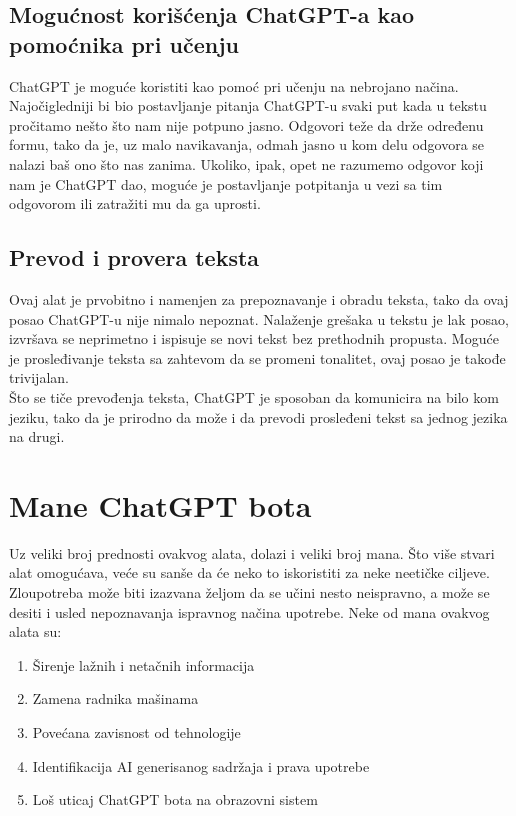 \documentclass[fleqn, 12pt]{article}
\begin{document}
    \subsection{Mogućnost korišćenja ChatGPT-a kao pomoćnika pri učenju}
        \begin{text}
            ChatGPT je moguće koristiti kao pomoć pri učenju na nebrojano načina. Najočigledniji bi bio postavljanje pitanja ChatGPT-u svaki put kada u tekstu pročitamo nešto što nam nije potpuno jasno. Odgovori teže da drže određenu formu, tako da je, uz malo navikavanja, odmah jasno u kom delu odgovora se nalazi baš ono što nas zanima. Ukoliko, ipak, opet ne razumemo odgovor koji nam je ChatGPT dao, moguće je postavljanje potpitanja u vezi sa tim odgovorom ili zatražiti mu da ga uprosti\cite{G7}.
        \end{text}
    \subsection{Prevod i provera teksta}
        \begin{text}
            Ovaj alat je prvobitno i namenjen za prepoznavanje i obradu teksta,  tako da ovaj posao ChatGPT-u nije nimalo nepoznat. Nalaženje grešaka u tekstu je lak posao, izvršava se neprimetno i ispisuje se novi tekst bez prethodnih propusta. Moguće je prosleđivanje teksta sa zahtevom da se promeni tonalitet, ovaj posao je takođe trivijalan.
            \\
            Što se tiče prevođenja teksta, ChatGPT je sposoban da komunicira na bilo kom jeziku, tako da je prirodno da može i da prevodi prosleđeni tekst sa jednog jezika na drugi.
        \end{text}
\newpage
\section{Mane ChatGPT bota}
Uz veliki broj prednosti ovakvog alata, dolazi i veliki broj mana. Što više stvari alat omogućava, veće su sanše da će neko to iskoristiti za neke neetičke ciljeve. Zloupotreba može biti izazvana željom da se učini nesto neispravno, a može se desiti i usled nepoznavanja ispravnog načina upotrebe. Neke od mana ovakvog alata su:
\begin{enumerate}
  \item Širenje lažnih i netačnih informacija
  \item Zamena radnika mašinama
  \item Povećana zavisnost od tehnologije
  \item Identifikacija AI generisanog sadržaja i prava upotrebe
  \item Loš uticaj ChatGPT bota na obrazovni sistem
\end{enumerate}
\end{document}
